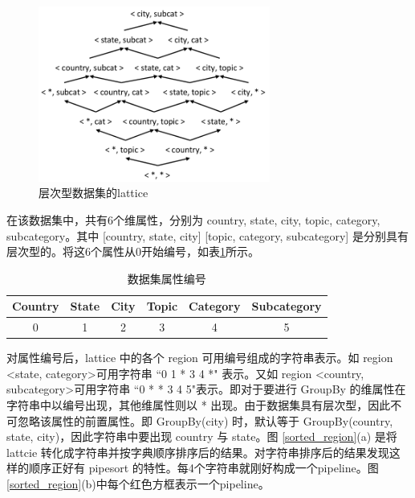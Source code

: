 \begin{figure}[!htb]
\centering\includegraphics[width=3in]{picture/ch_datacube_mr/dataset_lattice} 
\caption{层次型数据集的lattice}\label{dataset_lattice1} 
\end{figure} 

在该数据集中，共有6个维属性，分别为 country, state, city, topic, category, subcategory。其中 [country, state, city] [topic, category, subcategory] 是分别具有层次型的。将这6个属性从0开始编号，如表\ref{attribute_no}所示。

\begin{table}[!ht]
\begin{center}
\begin{tabular}{|c|c|c|c|c|c|}
\hline 
Country & State & City & Topic & Category & Subcategory \\ 
\hline 
0 & 1 & 2 & 3 & 4 & 5 \\ 
\hline 
\end{tabular} 
\end{center}
\caption{数据集属性编号}\label{attribute_no}
\end{table}

对属性编号后，lattice 中的各个 region 可用编号组成的字符串表示。如 region \textless state, category\textgreater 可用字符串 ``0 1 * 3 4 *" 表示。又如 region \textless country, subcategory\textgreater 可用字符串 ``0 * * 3 4 5"表示。即对于要进行 GroupBy 的维属性在字符串中以编号出现，其他维属性则以 * 出现。由于数据集具有层次型，因此不可忽略该属性的前置属性。即 GroupBy(city) 时，默认等于 GroupBy(country, state, city)，因此字符串中要出现 country 与 state。图 \ref{sorted_region}(a) 是将 lattcie 转化成字符串并按字典顺序排序后的结果。对字符串排序后的结果发现这样的顺序正好有 pipesort 的特性。每4个字符串就刚好构成一个pipeline。图\ref{sorted_region}(b)中每个红色方框表示一个pipeline。

